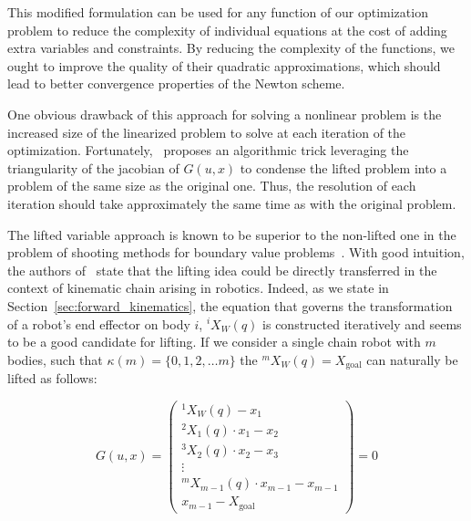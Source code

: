 This modified formulation can be used for any function of our optimization problem to reduce the complexity of individual equations at the cost of adding extra variables and constraints.
By reducing the complexity of the functions, we ought to improve the quality of their quadratic approximations, which should lead to better convergence properties of the Newton scheme.


One obvious drawback of this approach for solving a nonlinear problem is the increased size of the linearized problem to solve at each iteration of the optimization.
Fortunately,~\cite{Albersmeyer:2010:LNM:1958447.1958472} proposes an algorithmic trick leveraging the triangularity of the jacobian of $G(u,x)$ to condense the lifted problem into a problem of the same size as the original one.
Thus, the resolution of each iteration should take approximately the same time as with the original problem.

The lifted variable approach is known to be superior to the non-lifted one in the problem of shooting methods for boundary value problems~\cite{osborne:1969:shooting}.
With good intuition, the authors of~\cite{Albersmeyer:2010:LNM:1958447.1958472} state that the lifting idea could be directly transferred in the context of kinematic chain arising in robotics.
Indeed, as we state in Section~\ref{sec:forward_kinematics}, the equation that governs the transformation of a robot's end effector on body $i$, ${}^i X_W(q)$ is constructed iteratively and seems to be a good candidate for lifting.
If we consider a single chain robot with $m$ bodies, such that $\kappa (m) = \{0, 1, 2, \ldots m\}$ the ${}^m X_W(q) = X_\text{goal}$ can naturally be lifted as follows:

\begin{equation}
\label{eq:robot_lift}
  G(u,x) =
  \begin{pmatrix}
  {}^1 X_W(q) - x_1 \\
  {}^2 X_1(q)\cdot x_1 - x_2\\
  {}^3 X_2(q)\cdot x_2 - x_3 \\
  \vdots \\
  {}^m X_{m-1}(q)\cdot x_{m-1} - x_{m-1} \\
  x_{m-1} - X_\text{goal}
  \end{pmatrix}
  =0
\end{equation}

